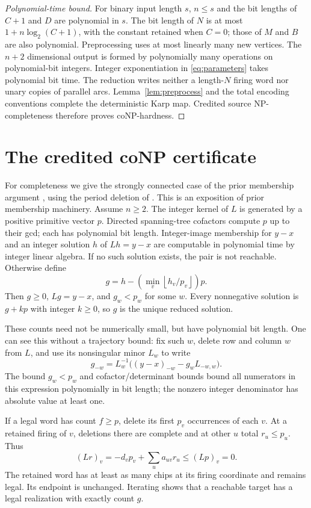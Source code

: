 \documentclass[11pt]{article}
\begin{document}
\begin{proof}[Polynomial-time bound]
For binary input length $s$, $n\leq s$ and the bit lengths of $C+1$
and $D$ are polynomial in $s$. The bit length of $N$ is at most
$1+n\log_2(C+1)$, with the constant retained when $C=0$; those of
$M$ and $B$ are also polynomial. Preprocessing uses at most linearly
many new vertices. The $n+2$ dimensional output is formed by
polynomially many operations on polynomial-bit integers. Integer
exponentiation in \eqref{eq:parameters} takes polynomial bit time.
The reduction writes neither a length-$N$ firing word nor unary
copies of parallel arcs. Lemma~\ref{lem:preprocess} and the total
encoding conventions complete the deterministic Karp map. Credited
source NP-completeness therefore proves coNP-hardness.
\end{proof}

\section{The credited coNP certificate}\label{sec:membership}
For completeness we give the strongly connected case of the prior
membership argument \cite[Theorem 12]{HKT}, using the period deletion
of \cite{BL}. This is an exposition of prior membership machinery.
Assume $n\geq2$. The integer kernel of $L$ is generated by a positive
primitive vector $p$. Directed spanning-tree cofactors compute $p$
up to their gcd; each has polynomial bit length. Integer-image
membership for $y-x$ and an integer solution $h$ of $Lh=y-x$ are
computable in polynomial time by integer linear algebra. If no such
solution exists, the pair is not reachable. Otherwise define
\[
 g=h-\left(\min_v\left\lfloor h_v/p_v\right\rfloor\right)p.
\]
Then $g\geq0$, $Lg=y-x$, and $g_w<p_w$ for some $w$. Every
nonnegative solution is $g+kp$ with integer $k\geq0$, so $g$ is the
unique reduced solution.

These counts need not be numerically small, but have polynomial bit
length. One can see this without a trajectory bound: fix such $w$,
delete row and column $w$ from $L$, and use its nonsingular minor
$L_w$ to write
\[
 g_{-w}=L_w^{-1}\big((y-x)_{-w}-g_wL_{-w,w}\big).
\]
The bound $g_w<p_w$ and cofactor/determinant bounds bound all
numerators in this expression polynomially in bit length; the
nonzero integer denominator has absolute value at least one.

If a legal word has count $f\geq p$, delete its first $p_v$
occurrences of each $v$. At a retained firing of $v$, deletions there
are complete and at other $u$ total $r_u\leq p_u$. Thus
\[
 (Lr)_v=-d_vp_v+\sum_u a_{uv}r_u\leq(Lp)_v=0.
\]
The retained word has at least as many chips at its firing coordinate
and remains legal. Its endpoint is unchanged. Iterating shows that
a reachable target has a legal realization with exactly count $g$.
\end{document}
